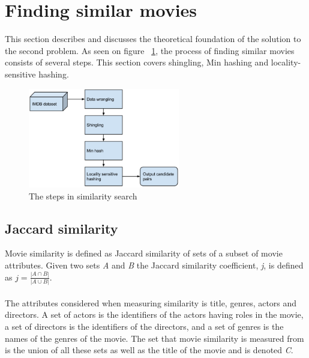 \section{Finding similar movies}
This section describes and discusses the theoretical foundation of the solution to the second problem. As seen on figure ~\ref{fig:search_diagram}, the process of finding similar movies consists of several steps. This section covers shingling, Min hashing and locality-sensitive hashing.
\begin{figure}[H]
	\centering
	\includegraphics[width=250px]{img/Similaritysearchdiagram.png}
	\caption{The steps in similarity search} 
	\label{fig:search_diagram}
\end{figure}
\subsection{Jaccard similarity}
Movie similarity is defined as Jaccard similarity of sets of a subset of movie attributes. Given two sets \textit{A} and \textit{B} the Jaccard similarity coefficient, \textit{j}, is defined as \(j = \frac{|A \cap B|}{|A \cup B|}\). \\ \\
The attributes considered when measuring similarity is title, genres, actors and directors. A set of actors is the identifiers of the actors having roles in the movie, a set of directors is the identifiers of the directors, and a set of genres is the names of the genres of the movie. The set that movie similarity is measured from is the union of all these sets as well as the title of the movie and is denoted \textit{C}.

